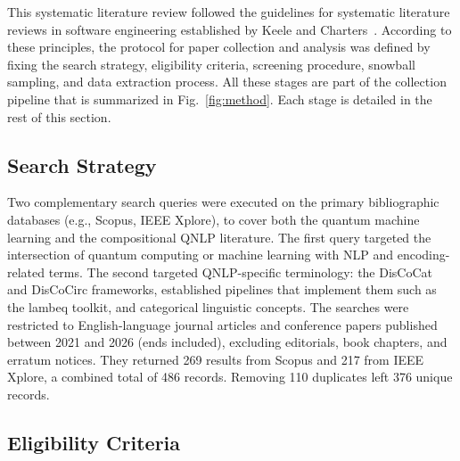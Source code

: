 \documentclass{ieeeaccess}
\begin{document}
This systematic literature review followed the guidelines for systematic
literature reviews in software engineering established by Keele and
Charters~\cite{keele2007guidelines}. According to these principles, the protocol for paper collection and analysis was defined by fixing
the search strategy, eligibility criteria, screening
procedure, snowball sampling, and data extraction process. All these stages are part of the collection pipeline that is summarized in Fig.~\ref{fig:method}. Each stage is detailed in the rest of this section.

\subsection{Search Strategy}
\label{subsec:search}

Two complementary search queries were executed on the primary bibliographic databases (e.g., Scopus, IEEE Xplore), to cover both the quantum machine learning and the
compositional QNLP literature. The first query targeted the intersection of
quantum computing or machine learning with NLP and encoding-related terms. The
second targeted QNLP-specific terminology: the DisCoCat and DisCoCirc
frameworks, established pipelines that implement them such as the lambeq
toolkit, and categorical linguistic concepts. The searches were restricted to
English-language journal articles and conference papers published between 2021
and 2026 (ends included), excluding editorials, book chapters, and erratum
notices. They returned 269 results from Scopus and 217 from IEEE Xplore, a
combined total of 486 records. Removing 110 duplicates left 376 unique records.

\subsection{Eligibility Criteria}
\label{sec:criteria}
\end{document}
